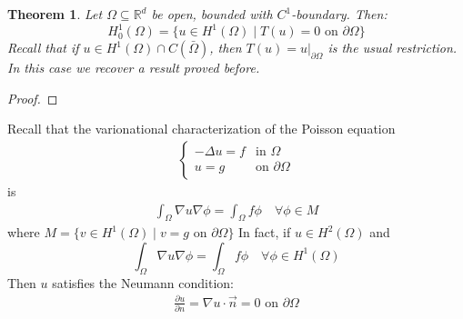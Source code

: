 \documentclass{report}
\theoremstyle{tommy}
\newtheorem{thm}[defn]{Theorem}
\begin{document}
  \begin{thm}
    Let \(\Omega \subseteq \mathbb{R}^d\) be open, bounded with \(C^1\)-boundary. Then:
    \[H_0^1(\Omega) = \{u \in H^1(\Omega) \mid T(u) = 0 \text{ on } \partial \Omega\}\]
    Recall that if \(u \in H^1(\Omega) \cap C(\bar \Omega)\), then \(T(u) = u|_{\partial \Omega}\) is the usual restriction. In this case we recover a result proved before.
  \end{thm}

  \begin{proof}
  \end{proof}

  Recall that the varionational characterization of the Poisson equation 
  \begin{align*}
    \begin{cases}
      - \Delta u = f &\text{in } \Omega \\ u = g &\text{on } \partial \Omega
    \end{cases}
  \end{align*}
  is 
  \begin{align*}
    \int_\Omega \nabla u \nabla \phi = \int_\Omega f \phi \quad \forall \phi \in M
  \end{align*}
  where \(M = \{v \in H^1(\Omega) \mid v = g \text{ on } \partial \Omega\}\)
  In fact, if \(u \in H^2(\Omega)\) and 
  \[\int_\Omega \nabla u \nabla \phi = \int_\Omega f \phi \quad \forall \phi \in H^1(\Omega)\]
  Then \(u\) satisfies the Neumann condition:
  \begin{align*}
    \frac{\partial u}{\partial n} = \nabla u \cdot \vec{n} = 0 \text{ on } \partial \Omega
  \end{align*}
\end{document}

